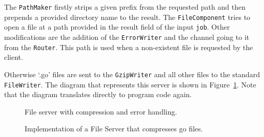 The \texttt{PathMaker} firstly strips a given
prefix from the requested path and then prepends a provided directory name to 
the result. The \texttt{FileComponent} tries to open a file at a path 
provided in the result field of the input \texttt{job}. Other modifications
are the addition of the \texttt{ErrorWriter} and the channel going to it from
the \texttt{Router}.
This path is used when a non-existent file is requested by the client.

Otherwise `.go' files are sent to the \texttt{GzipWriter} and all other files to 
the standard \texttt{FileWriter}.
The diagram that represents this server is shown in 
Figure~\ref{fig:fileServer3}. Note that the diagram translates directly 
to program code again.

\begin{figure}[h]
\centering
{}
\caption[scale=1.0]{File server with compression and error handling.}
\label{fig:fileServer3}
\end{figure}

\begin{figure}
\vspace{-1cm}

\caption[scale=1.0]{Implementation of a File Server that compresses go files.}
\label{fig:FileServerImpl}
\end{figure}

\newpage
